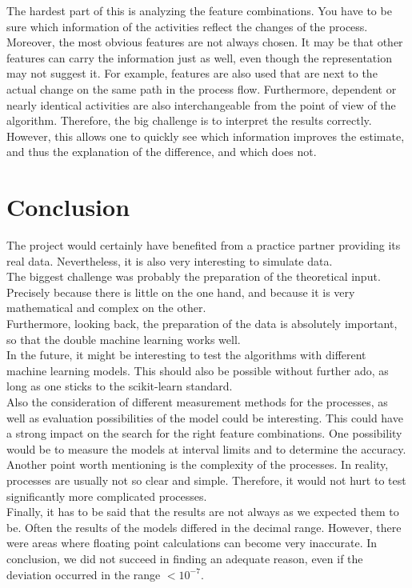     The hardest part of this is analyzing the feature combinations. You have to be sure which information of the activities reflect the changes of the process. Moreover, the most obvious features are not always chosen. It may be that other features can carry the information just as well, even though the representation may not suggest it. For example, features are also used that are next to the actual change on the same path in the process flow. Furthermore, dependent or nearly identical activities are also interchangeable from the point of view of the algorithm. Therefore, the big challenge is to interpret the results correctly.\\
    However, this allows one to quickly see which information improves the estimate, and thus the explanation of the difference, and which does not.

\clearpage
\chapter{Conclusion}
The project would certainly have benefited from a practice partner providing its real data. Nevertheless, it is also very interesting to simulate data.\\
The biggest challenge was probably the preparation of the theoretical input. Precisely because there is little on the one hand, and because it is very mathematical and complex on the other.\\
Furthermore, looking back, the preparation of the data is absolutely important, so that the double machine learning works well.\\
In the future, it might be interesting to test the algorithms with different machine learning models. This should also be possible without further ado, as long as one sticks to the scikit-learn standard.\\
Also the consideration of different measurement methods for the processes, as well as evaluation possibilities of the model could be interesting. This could have a strong impact on the search for the right feature combinations. One possibility would be to measure the models at interval limits and to determine the accuracy.\\
Another point worth mentioning is the complexity of the processes. In reality, processes are usually not so clear and simple. Therefore, it would not hurt to test significantly more complicated processes.\\
Finally, it has to be said that the results are not always as we expected them to be. Often the results of the models differed in the decimal range. However, there were areas where floating point calculations can become very inaccurate. In conclusion, we did not succeed in finding an adequate reason, even if the deviation occurred in the range $<10^{-7}$.
\clearpage